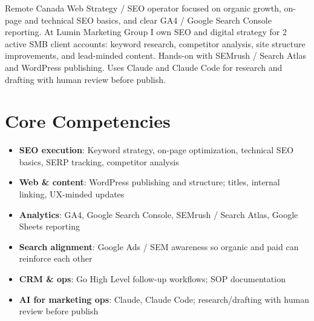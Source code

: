 \documentclass[11pt,a4paper,sans]{moderncv}
\begin{document}
\makecvtitle

\vspace{6pt}
\small{Remote Canada Web Strategy / SEO operator focused on organic growth, on-page and technical SEO basics, and clear GA4 / Google Search Console reporting. At Lumin Marketing Group I own SEO and digital strategy for 2 active SMB client accounts: keyword research, competitor analysis, site structure improvements, and lead-minded content. Hands-on with SEMrush / Search Atlas and WordPress publishing. Uses Claude and Claude Code for research and drafting with human review before publish.}

\section{Core Competencies}
\vspace{1pt}
\begin{itemize}
\item \textbf{SEO execution}: Keyword strategy, on-page optimization, technical SEO basics, SERP tracking, competitor analysis
\item \textbf{Web \& content}: WordPress publishing and structure; titles, internal linking, UX-minded updates
\item \textbf{Analytics}: GA4, Google Search Console, SEMrush / Search Atlas, Google Sheets reporting
\item \textbf{Search alignment}: Google Ads / SEM awareness so organic and paid can reinforce each other
\item \textbf{CRM \& ops}: Go High Level follow-up workflows; SOP documentation
\item \textbf{AI for marketing ops}: Claude, Claude Code; research/drafting with human review before publish
\end{itemize}
\end{document}
